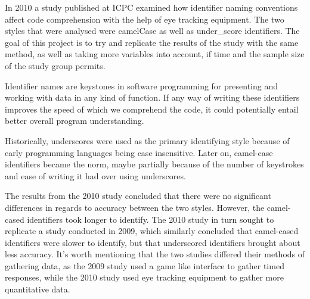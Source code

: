 \iffalse
\begin{itemize}
  \item Have a specific background or spread it out
  \item May be necessary to introduce certain things
  \item From our running example, we might discuss prior work on simplifying parallel programming, or SOTA with e.g., threads
\end{itemize}
\fi

In 2010 a study published at ICPC examined how identifier naming conventions affect code comprehension with the help of eye tracking equipment. The two styles that were analysed were camelCase as well as under\_score identifiers. The goal of this project is to try and replicate the results of the study with the same method, as well as taking more variables into account, if time and the sample size of the study group permits.

Identifier names are keystones in software programming for presenting and working with data in any kind of function. If any way of writing these identifiers improves the speed of which we comprehend the code, it could potentially entail better overall program understanding.

Historically, underscores were used as the primary identifying style because of early programming languages being case insensitive. Later on, camel-case identifiers became the norm, maybe partially because of the number of keystrokes and ease of writing it had over using underscores.

The results from the 2010 study concluded that there were no significant differences in regards to accuracy between the two styles. However, the camel-cased identifiers took longer to identify. The 2010 study in turn sought to replicate a study conducted in 2009, which similarly concluded that camel-cased identifiers were slower to identify, but that underscored identifiers brought about less accuracy. It's worth mentioning that the two studies differed their methods of gathering data, as the 2009 study used a game like interface to gather timed responses, while the 2010 study used eye tracking equipment to gather more quantitative data.
